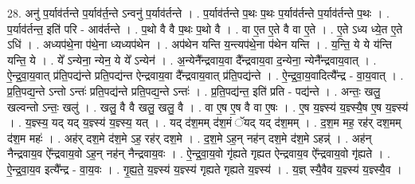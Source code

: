 \documentclass[17pt]{extarticle}
\begin{document}
28. अनु॑ प॒र्याव॑र्तन्ते प॒र्याव॑र्त॒न्ते ऽन्वनु॑ प॒र्याव॑र्तन्ते । . प॒र्याव॑र्तन्ते प॒थः प॒थः प॒र्याव॑र्तन्ते प॒र्याव॑र्तन्ते प॒थः । . प॒र्याव॑र्तन्त॒ इति॑ परि - आव॑र्तन्ते । . प॒थो वै वै प॒थः प॒थो वै । . वा ए॒त ए॒ते वै वा ए॒ते । . ए॒ते ऽध्य ध्ये॒त ए॒ते ऽधि॑ । . अध्यप॑थे॒ना प॑थे॒ना ध्यध्यप॑थेन । . अप॑थेन यन्ति य॒न्त्यप॑थे॒ना प॑थेन यन्ति । . य॒न्ति॒ ये ये य॑न्ति यन्ति॒ ये । . ये᳚ ऽन्येना॒ न्येन॒ ये ये᳚ ऽन्येन॑ । . अ॒न्येनै᳚न्द्रवाय॒वा दै᳚न्द्रवाय॒वा द॒न्येना॒ न्येनै᳚न्द्रवाय॒वात् । . ऐ॒न्द्र॒वा॒य॒वात् प्र॑ति॒पद्य॑न्ते प्रति॒पद्य॑न्त ऐन्द्रवाय॒वा दै᳚न्द्रवाय॒वात् प्र॑ति॒पद्य॑न्ते । . ऐ॒न्द्र॒वा॒य॒वादित्यै᳚न्द्र - वा॒य॒वात् । . प्र॒ति॒पद्य॒न्ते ऽन्तो ऽन्तः॑ प्रति॒पद्य॑न्ते प्रति॒पद्य॒न्ते ऽन्तः॑ । . प्र॒ति॒पद्य॑न्त॒ इति॑ प्रति - पद्य॑न्ते । . अन्तः॒ खलु॒ खल्वन्तो ऽन्तः॒ खलु॑ । . खलु॒ वै वै खलु॒ खलु॒ वै । . वा ए॒ष ए॒ष वै वा ए॒षः । . ए॒ष य॒ज्ञ्स्य॑ य॒ज्ञ्स्यै॒ष ए॒ष य॒ज्ञ्स्य॑ । . य॒ज्ञ्स्य॒ यद् यद् य॒ज्ञ्स्य॑ य॒ज्ञ्स्य॒ यत् । . यद् द॑श॒मम् द॑श॒मं ॅयद् यद् द॑श॒मम् । . द॒श॒म मह॒ रह॑र् दश॒मम् द॑श॒म महः॑ । . अह॑र् दश॒मे द॑श॒मे ऽह॒ रह॑र् दश॒मे । . द॒श॒मे ऽह॒न् नह॑न् दश॒मे द॑श॒मे ऽहन्न्॑ । . अह॑न् नैन्द्रवाय॒व ऐ᳚न्द्रवाय॒वो ऽह॒न् नह॑न् नैन्द्रवाय॒वः । . ऐ॒न्द्र॒वा॒य॒वो गृ॑ह्यते गृह्यत ऐन्द्रवाय॒व ऐ᳚न्द्रवाय॒वो गृ॑ह्यते । . ऐ॒न्द्र॒वा॒य॒व इत्यै᳚न्द्र - वा॒य॒वः । . गृ॒ह्य॒ते॒ य॒ज्ञ्स्य॑ य॒ज्ञ्स्य॑ गृह्यते गृह्यते य॒ज्ञ्स्य॑ । . य॒ज्ञ् स्यै॒वैव य॒ज्ञ्स्य॑ य॒ज्ञ्स्यै॒व । \newline
\end{document}
